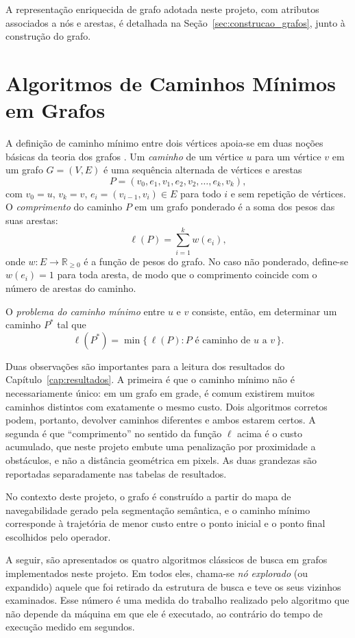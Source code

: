 \documentclass[
    12pt,
    openright,
    oneside,
    a4paper,
    english,
    brazil
]{abntex2}
\begin{document}
A representação enriquecida de grafo adotada neste projeto, com atributos associados a nós e arestas, é detalhada na Seção~\ref{sec:construcao_grafos}, junto à construção do grafo.

\section{Algoritmos de Caminhos Mínimos em Grafos}
\label{sec:caminhos_minimos}

A definição de caminho mínimo entre dois vértices apoia-se em duas noções básicas da teoria dos grafos \cite{deo2016, chen1997}. Um \emph{caminho} de um vértice $u$ para um vértice $v$ em um grafo $G = (V, E)$ é uma sequência alternada de vértices e arestas
\[
P = (v_0, e_1, v_1, e_2, v_2, \ldots, e_k, v_k),
\]
com $v_0 = u$, $v_k = v$, $e_i = (v_{i-1}, v_i) \in E$ para todo $i$ e sem repetição de vértices. O \emph{comprimento} do caminho $P$ em um grafo ponderado é a soma dos pesos das suas arestas:
\[
\ell(P) = \sum_{i=1}^{k} w(e_i),
\]
onde $w : E \to \mathbb{R}_{\geq 0}$ é a função de pesos do grafo. No caso não ponderado, define-se $w(e_i) = 1$ para toda aresta, de modo que o comprimento coincide com o número de arestas do caminho.

O \emph{problema do caminho mínimo} entre $u$ e $v$ consiste, então, em determinar um caminho $P^\ast$ tal que
\[
\ell(P^\ast) = \min \{\, \ell(P) : P \text{ é caminho de } u \text{ a } v \,\}.
\]

Duas observações são importantes para a leitura dos resultados do Capítulo~\ref{cap:resultados}. A primeira é que o caminho mínimo não é necessariamente único: em um grafo em grade, é comum existirem muitos caminhos distintos com exatamente o mesmo custo. Dois algoritmos corretos podem, portanto, devolver caminhos diferentes e ambos estarem certos. A segunda é que ``comprimento'' no sentido da função $\ell$ acima é o custo acumulado, que neste projeto embute uma penalização por proximidade a obstáculos, e não a distância geométrica em pixels. As duas grandezas são reportadas separadamente nas tabelas de resultados.

No contexto deste projeto, o grafo é construído a partir do mapa de navegabilidade gerado pela segmentação semântica, e o caminho mínimo corresponde à trajetória de menor custo entre o ponto inicial e o ponto final escolhidos pelo operador.

A seguir, são apresentados os quatro algoritmos clássicos de busca em grafos implementados neste projeto. Em todos eles, chama-se \emph{nó explorado} (ou expandido) aquele que foi retirado da estrutura de busca e teve os seus vizinhos examinados. Esse número é uma medida do trabalho realizado pelo algoritmo que não depende da máquina em que ele é executado, ao contrário do tempo de execução medido em segundos.
\end{document}
